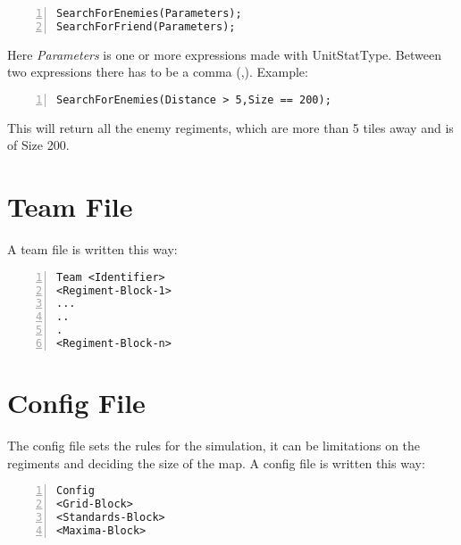		\begin{lstlisting}[basicstyle=\small\sffamily,
		keywordstyle={\color{blue}},
		comment={[l]{//}}, morecomment={[s]{/*}{*/}}, commentstyle=\itshape,
		columns={[l]flexible}, numbers=left, numberstyle=\tiny,
		frameround=fftt, frame=shadowbox, captionpos=b,
		caption={RegimentSearch Functions}]
SearchForEnemies(Parameters);
SearchForFriend(Parameters);
	\end{lstlisting}
	Here {\it Parameters} is one or more expressions made with UnitStatType. Between two expressions there has to be a comma (,).
	Example: \\

		\begin{lstlisting}[basicstyle=\small\sffamily,
		keywordstyle={\color{blue}},
		comment={[l]{//}}, morecomment={[s]{/*}{*/}}, commentstyle=\itshape,
		columns={[l]flexible}, numbers=left, numberstyle=\tiny,
		frameround=fftt, frame=shadowbox, captionpos=b,
		caption={Functions with parameters}]
SearchForEnemies(Distance > 5,Size == 200);
	\end{lstlisting}
	This will return all the enemy regiments, which are more than 5 tiles away and is of Size 200.		
\section{Team File}
\label{doc:teamfile}
	A team file is written this way: \\

		\begin{lstlisting}[basicstyle=\small\sffamily,
		keywordstyle={\color{blue}},
		comment={[l]{//}}, morecomment={[s]{/*}{*/}}, commentstyle=\itshape,
		columns={[l]flexible}, numbers=left, numberstyle=\tiny,
		frameround=fftt, frame=shadowbox, captionpos=b,
		caption={Regiment Assignment},
		label=RegimentAssignment]
Team <Identifier>
<Regiment-Block-1>
...
..
.
<Regiment-Block-n>
		\end{lstlisting}
	
\section{Config File}
\label{doc:cfgfile}
	The config file sets the rules for the simulation, it can be limitations on the regiments and deciding the size of the map.
	A config file is written this way: \\

		\begin{lstlisting}[basicstyle=\small\sffamily,
		keywordstyle={\color{blue}},
		comment={[l]{//}}, morecomment={[s]{/*}{*/}}, commentstyle=\itshape,
		columns={[l]flexible}, numbers=left, numberstyle=\tiny,
		frameround=fftt, frame=shadowbox, captionpos=b,
		caption={Config file}]
Config
<Grid-Block>
<Standards-Block>
<Maxima-Block>
		\end{lstlisting}
	
